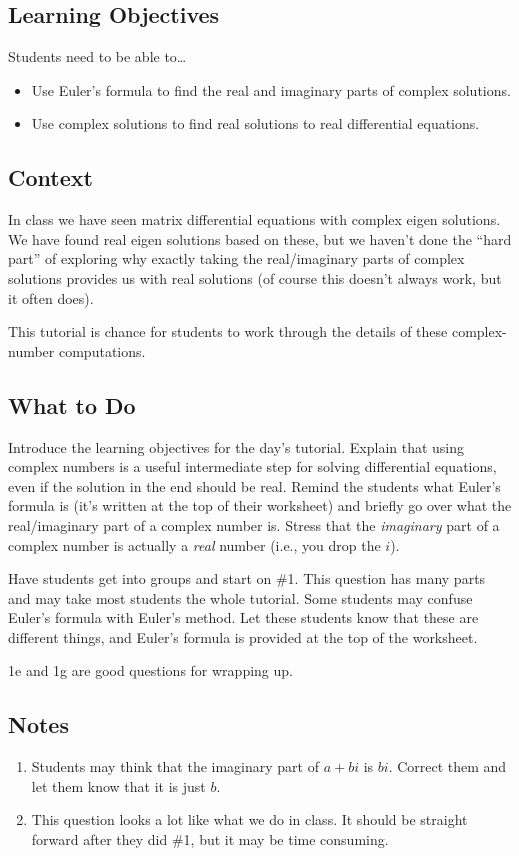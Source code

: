 \subsection*{Learning Objectives}
	Students need to be able to\ldots
	\begin{itemize}
		\item Use Euler's formula to find the real and imaginary parts of complex solutions.
		\item Use complex solutions to find real solutions to real differential equations.
	\end{itemize}

\vspace*{-.5cm}
\subsection*{Context}

In class we have seen matrix differential equations with complex eigen solutions. We have found real eigen solutions
based on these, but we haven't done the ``hard part'' of exploring why exactly taking the real/imaginary parts of complex
solutions provides us with real solutions (of course this doesn't always work, but it often does).

This tutorial is chance for students to work through the details of these complex-number computations.

\subsection*{What to Do}
	Introduce the learning objectives for the day's tutorial. Explain that using complex numbers is a useful 
	intermediate step for solving differential equations, even if the solution in the end should be real. Remind the
	students what Euler's formula is (it's written at the top of their worksheet) and briefly go over what the real/imaginary 
	part of a complex number is. Stress that the \emph{imaginary} part of a complex number is actually a \emph{real} number (i.e., you
	drop the $i$).
	
	Have students get into groups and start on \#1. This question has many parts and may take most students the whole tutorial.
	Some students may confuse Euler's formula with Euler's method. Let these students know that these are different things, and Euler's
	formula is provided at the top of the worksheet.
	
	1e and 1g are good questions for wrapping up.

\subsection*{Notes}
	\begin{enumerate}
		\item Students may think that the imaginary part of $a+bi$ is $bi$. Correct them and let them know that it is just $b$.
		\item This question looks a lot like what we do in class. It should be straight forward after they did \#1, but it may be time consuming.
	\end{enumerate}